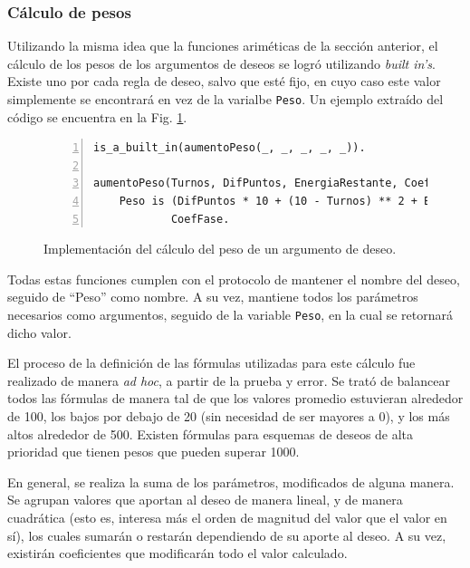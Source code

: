 \documentclass[oneside]{book}
\theoremstyle{definition}
\begin{document}
\subsubsection{Cálculo de pesos}

Utilizando la misma idea que la funciones ariméticas de la sección anterior, el
cálculo de los pesos de los argumentos de deseos se logró utilizando \textit{built 
in's}. Existe uno por cada regla de deseo, salvo que esté fijo, en cuyo caso 
este valor simplemente se encontrará en vez de la varialbe \texttt{Peso}. Un 
ejemplo extraído del código se encuentra en la Fig. \ref{fig:calculoDePeso}.

\begin{figure}[b]
\begin{Verbatim}[numbers=left]
is_a_built_in(aumentoPeso(_, _, _, _, _)).

aumentoPeso(Turnos, DifPuntos, EnergiaRestante, CoefFase, Peso) :-
    Peso is (DifPuntos * 10 + (10 - Turnos) ** 2 + EnergiaRestante) * 
    		CoefFase.
\end{Verbatim}
\caption{Implementación del cálculo del peso de un argumento de deseo.}
\label{fig:calculoDePeso}
\end{figure}


Todas estas funciones cumplen con el protocolo de mantener el nombre del deseo,
seguido de ``Peso'' como nombre. A su vez, mantiene todos los parámetros 
necesarios como argumentos, seguido de la variable \texttt{Peso}, en la cual se 
retornará dicho valor.

El proceso de la definición de las fórmulas utilizadas para este cálculo fue 
realizado de manera \textit{ad hoc}, a partir de la prueba y error. Se trató
de balancear todos las fórmulas de manera tal de que los valores promedio 
estuvieran alrededor de 100, los bajos por debajo de 20 (sin necesidad de ser
mayores a 0), y los más altos alrededor de 500. Existen fórmulas para esquemas
de deseos de alta prioridad que tienen pesos que pueden superar 1000.

En general, se realiza la suma de los parámetros, modificados de alguna manera.
Se agrupan valores que aportan al deseo de manera lineal, y de manera cuadrática
(esto es, interesa más el orden de magnitud del valor que el valor en sí), los
cuales sumarán o restarán dependiendo de su aporte al deseo. A su vez, 
existirán coeficientes que modificarán todo el valor calculado.
\end{document}
